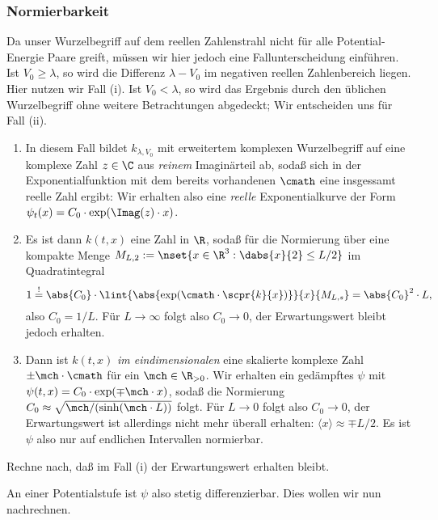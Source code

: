\documentclass{subfiles}
\begin{document}
    \subsubsection*{Normierbarkeit}
        Da unser Wurzelbegriff auf dem reellen Zahlenstrahl nicht für alle Potential-Energie Paare greift, müssen wir hier jedoch eine Fallunterscheidung einführen. Ist $V_0\geq \lambda$, so wird die Differenz $\lambda - V_0$ im negativen reellen Zahlenbereich liegen. Hier nutzen wir Fall (i). Ist $V_0 < \lambda$, so wird das Ergebnis durch den üblichen Wurzelbegriff ohne weitere Betrachtungen abgedeckt; Wir entscheiden uns für Fall (ii). 
        \begin{enumerate}[label=(\roman*)]
            \item In diesem Fall bildet $k_{\lambda,V_0}$ mit erweitertem komplexen Wurzelbegriff auf eine komplexe Zahl $z\in\C$ aus \emph{reinem} Imaginärteil ab, sodaß sich in der Exponentialfunktion mit dem bereits vorhandenen $\cmath$ eine insgessamt reelle Zahl ergibt: Wir erhalten also eine \emph{reelle} Exponentialkurve der Form $\psi_t(x) = C_0\cdot\exp(\Imag(z)\cdot x)$.
            \item Es ist dann $k(t,x)$ eine Zahl in $\R$, sodaß für die Normierung über eine kompakte Menge $M_{L,2}:=\nset{x\in\R^3:\dabs{x}{2} \leq L/2}$ im Quadratintegral 
            \[1 \stackrel{!}{=} \abs{C_0}\cdot\lint{\abs{\exp(\cmath\cdot\scpr{k}{x})}}{x}{M_{L,s}} = \abs{C_0}^2\cdot L,\]
            also $C_0 = 1/L$. Für $L\to\infty$ folgt also $C_0\to 0$, der Erwartungswert bleibt jedoch erhalten. 
            \item Dann ist $k(t,x)$ \emph{im eindimensionalen} eine skalierte komplexe Zahl $\pm\mch\cdot\cmath$ für ein $\mch\in\R_{>0}$. Wir erhalten ein gedämpftes $\psi$ mit $\psi(t,x) = C_0\cdot\exp(\mp\mch\cdot x)$, sodaß die Normierung $C_0\approx\sqrt{\mch/(\sinh(\mch\cdot L))}$ folgt. Für $L\to 0$ folgt also $C_0\to 0$, der Erwartungswert ist allerdings nicht mehr überall erhalten: $\langle x\rangle\approx \mp L/2$. Es ist $\psi$ also nur auf endlichen Intervallen normierbar.
        \end{enumerate}
        \begin{Aufgabe}
            \nr{} Rechne nach, daß im Fall (i) der Erwartungswert erhalten bleibt. 
        \end{Aufgabe}
        An einer Potentialstufe ist $\psi$ also stetig differenzierbar. Dies wollen wir nun nachrechnen.
        
\end{document}
